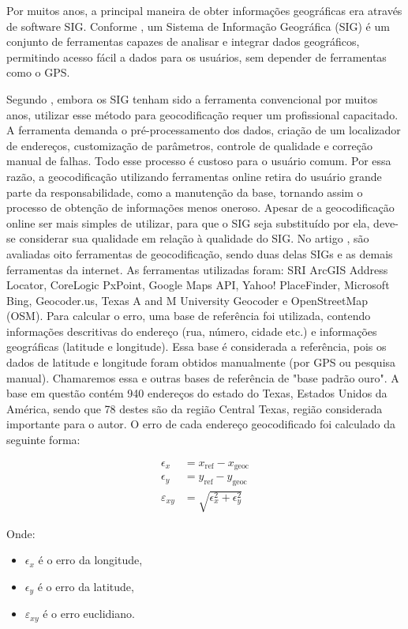 Por muitos anos, a principal maneira de obter informações geográficas era através de software SIG. Conforme \cite{stein2021geoprocessamento}, um Sistema de Informação Geográfica (SIG) é um conjunto de ferramentas capazes de analisar e integrar dados geográficos, permitindo acesso fácil a dados para os usuários, sem depender de ferramentas como o GPS.

Segundo \cite{Chow2016}, embora os SIG tenham sido a ferramenta convencional por muitos anos, utilizar esse método para geocodificação requer um profissional capacitado. A ferramenta demanda o pré-processamento dos dados, criação de um localizador de endereços, customização de parâmetros, controle de qualidade e correção manual de falhas. Todo esse processo é custoso para o usuário comum. Por essa razão, a geocodificação utilizando ferramentas online retira do usuário grande parte da responsabilidade, como a manutenção da base, tornando assim o processo de obtenção de informações menos oneroso.
Apesar de a geocodificação online ser mais simples de utilizar, para que o SIG seja substituído por ela, deve-se considerar sua qualidade em relação à qualidade do SIG. No artigo \cite{Chow2016}, são avaliadas oito ferramentas de geocodificação, sendo duas delas SIGs e as demais ferramentas da internet. As ferramentas utilizadas foram: SRI ArcGIS Address Locator, CoreLogic PxPoint, Google Maps API, Yahoo! PlaceFinder, Microsoft Bing, Geocoder.us, Texas A and M University Geocoder e OpenStreetMap (OSM). Para calcular o erro, uma base de referência foi utilizada, contendo informações descritivas do endereço (rua, número, cidade etc.) e informações geográficas (latitude e longitude). Essa base é considerada a referência, pois os dados de latitude e longitude foram obtidos manualmente (por GPS ou pesquisa manual). Chamaremos essa e outras bases de referência de "base padrão ouro". A base em questão contém 940 endereços do estado do Texas, Estados Unidos da América, sendo que 78 destes são da região Central Texas, região considerada importante para o autor. O erro de cada endereço geocodificado foi calculado da seguinte forma:

\begin{align}
   \epsilon_x &= x_{\text{ref}} - x_{\text{geoc}} \\
   \epsilon_y &= y_{\text{ref}} - y_{\text{geoc}} \\
   \varepsilon_{xy} &= \sqrt{\epsilon_x^2 + \epsilon_y^2}
\end{align}

Onde:
\begin{itemize}
   \item $\epsilon_x$ é o erro da longitude,
   \item $\epsilon_y$ é o erro da latitude,
   \item $\varepsilon_{xy}$ é o erro euclidiano.
\end{itemize}
   
